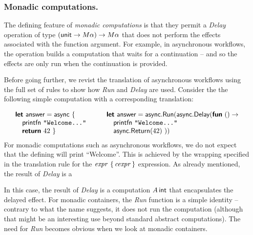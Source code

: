\documentclass[runningheads,a4paper]{llncs}
\begin{document}
\vspace{-1em}
\subsubsection{Monadic computations.} The defining feature of \emph{monadic computations}
is that they permit a \emph{Delay} operation of type $(\textnormal{\sffamily unit} \rightarrow M\alpha) \rightarrow M\alpha$
that does not perform the effects associated with the function argument.
For example, in asynchronous workflows, the operation builds 
a computation that waits for a continuation -- and so the effects are only run when the continuation
is provided.

Before going further, we revist the translation of asynchronous workflows using the full set of
rules to show how \emph{Run} and \emph{Delay} are used. Consider the the following simple computation
with a corresponding translation:

\begin{equation*}
\begin{array}{l}
\kvd{let}~\ident{answer} = \ident{async}~\{\\
\quad \ident{printfn}~ \texttt{"Welcome..."}\\
\quad \kvd{return}~ 42 ~\}
\end{array}
\qquad
\begin{array}{l}
\kvd{let}~\ident{answer} = \ident{async}.\ident{Run}(\ident{async}.\ident{Delay}(\kvd{fun}~()\rightarrow\\
\quad \ident{printfn}~ \texttt{"Welcome..."}\\
\quad \ident{async}.\ident{Return}(42)~))
\end{array}
\end{equation*}
%
For monadic computations such as asynchronous workflows, we do not expect that the defining
 will print ``Welcome''. This is achieved by the wrapping specified in the 
translation rule for the $\textnormal{\emph{expr}}~\{\,\textnormal{\emph{cexpr}}\,\}$ expression. As already mentioned, the result
of \emph{Delay} is a 

In this case, the result of \emph{Delay} is a computation $A\,\textnormal{\sffamily int}$ that encapsulates the
delayed effect. For monadic containers, the \emph{Run} function is a simple identity -- contrary
to what the name suggests, it does not run the computation (although that might be an interesting
use beyond standard abstract computations). The need for \emph{Run} becomes obvious when we look
at monadic containers.

\vspace{-1em}
\end{document}

